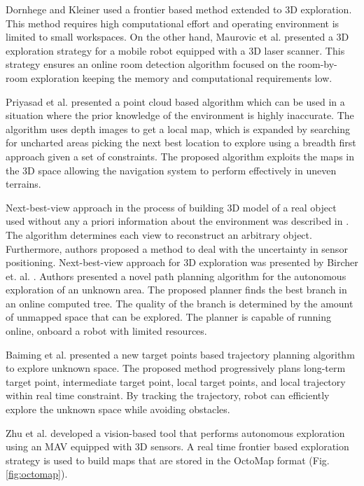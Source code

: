 Dornhege and Kleiner \cite{Dornhege2013} used a frontier based method extended to 3D exploration. This method requires high computational effort and operating environment is limited to small workspaces. On the other hand, Maurovic et al. \cite{Maurovic2014} presented a 3D exploration strategy for a mobile robot equipped with a 3D laser scanner. This strategy ensures an online room detection algorithm focused on the room-by-room exploration keeping the memory and computational requirements low.

Priyasad et al. \cite{Priyasad2018} presented a point cloud based algorithm which can be used in a situation where the prior knowledge of the environment is highly inaccurate. The algorithm uses depth images to get a local map, which is expanded by searching for uncharted areas picking the next best
location to explore using a breadth first approach given a set of
constraints. The proposed algorithm exploits the maps in the 3D
space allowing the navigation system to perform effectively in uneven terrains. 

Next-best-view approach in the process of building 3D model of a real object used without any a priori information about the environment was described in \cite{VasquezGomez2014}. The algorithm determines each view to reconstruct an arbitrary object. Furthermore, authors proposed a method to deal with the uncertainty in sensor positioning.
Next-best-view approach for 3D exploration was presented by Bircher et. al. \cite{Bircher2016}. Authors presented a novel path planning algorithm for the autonomous exploration of an unknown area. The proposed planner finds the best branch in an online computed tree. The quality of the branch is determined by the amount of unmapped space that can be explored. The planner is capable of running online, onboard a robot with limited resources.

Baiming et al. \cite{Baiming2018} presented a new target points based trajectory planning algorithm to explore unknown space. The proposed method progressively plans long-term target point, intermediate target point, local target points, and local trajectory within real time constraint. By tracking the trajectory, robot can efficiently explore the unknown space while avoiding obstacles.

Zhu et al. \cite{Zhu2015} developed a vision-based tool that performs autonomous exploration using an MAV equipped with 3D sensors. A real time frontier based exploration strategy is used to build maps that are stored in the OctoMap format (Fig. \ref{fig:octomap}).

